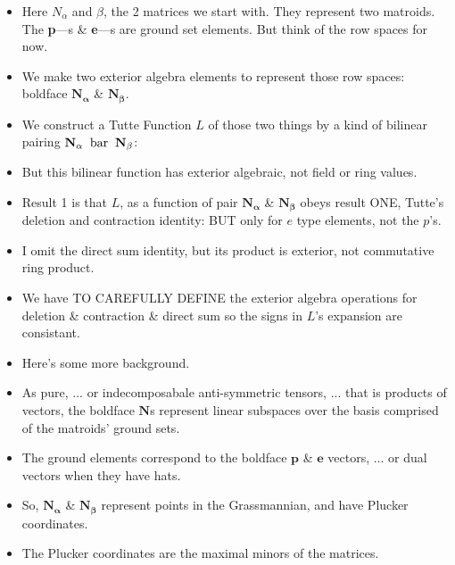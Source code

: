 \documentclass[14pt]{extarticle}
\begin{document}
{\bf
  \begin{itemize}
  \item Here $N_\alpha$ and $\beta$, the 2 matrices we start with.
    They represent two matroids.  The \textbf{p}---s \&
    \textbf{e}---s are ground set elements.  But think of the row spaces for now.

\item We make two exterior algebra elements to represent those row spaces:
   boldface $\mathbf{N_\alpha}$ \& $\mathbf{N_\beta}$.

\item We construct a Tutte Function $L$ of those two things by a kind of bilinear pairing
  $\mathbf{N_\alpha} \text{\;\;bar\;\;} \mathbf{N_\beta}$:

\item But this bilinear function has exterior algebraic, not field or ring values. 

\item Result 1 is that $L$, as a function of pair $\mathbf{N_\alpha}$ \&
  $\mathbf{N_\beta}$ obeys result ONE, Tutte's deletion and contraction identity:  BUT
  only for $e$ type elements, not the $p$'s.

\item I omit the direct sum identity, but its product is exterior, not
  commutative ring product.

\item We have TO CAREFULLY DEFINE the exterior algebra operations for deletion \&
  contraction \& direct sum so the signs in $L$'s expansion are consistant.

\item Here's some more background.
  
\item
  As pure, ... or indecomposabale anti-symmetric tensors, ... that is 
  products of vectors, the boldface
  $\mathbf{N}$s represent linear subspaces over the
  basis comprised of the matroids' ground sets.

\item The ground elements correspond to the boldface $\mathbf{p}$ \&
  $\mathbf{e}$ vectors, ... or dual vectors when they have hats.

\item
  So, $\mathbf{N_\alpha}$ \& $\mathbf{N_\beta}$ represent points in the
  Grassmannian, and have Plucker coordinates.

\item
  The Plucker coordinates are the maximal minors of the matrices.


\end{itemize}}
\end{document}
